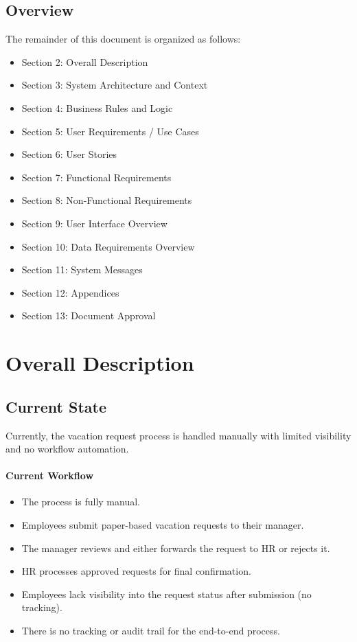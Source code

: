 \documentclass[12pt,a4paper]{article}
\begin{document}
\subsection{Overview}
The remainder of this document is organized as follows:
\begin{itemize}
    \item Section 2: Overall Description
    \item Section 3: System Architecture and Context
    \item Section 4: Business Rules and Logic
    \item Section 5: User Requirements / Use Cases
    \item Section 6: User Stories
    \item Section 7: Functional Requirements
    \item Section 8: Non-Functional Requirements
    \item Section 9: User Interface Overview
    \item Section 10: Data Requirements Overview
    \item Section 11: System Messages
    \item Section 12: Appendices
    \item Section 13: Document Approval
\end{itemize}

\section{Overall Description}

\subsection{Current State}
Currently, the vacation request process is handled manually with limited visibility and no workflow automation.

\paragraph{Current Workflow}
\begin{itemize}
    \item The process is fully manual.
    \item Employees submit paper-based vacation requests to their manager.
    \item The manager reviews and either forwards the request to HR or rejects it.
    \item HR processes approved requests for final confirmation.
    \item Employees lack visibility into the request status after submission (no tracking).
    \item There is no tracking or audit trail for the end-to-end process.
\end{itemize}
\end{document}
